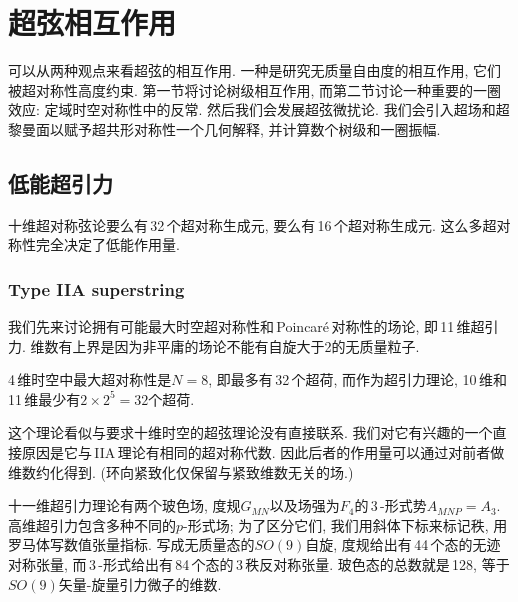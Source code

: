 
\chapter{超弦相互作用}

可以从两种观点来看超弦的相互作用. 一种是研究无质量自由度的相互作用, 它们被超对称性高度约束. 第一节将讨论树级相互作用, 而第二节讨论一种重要的一圈效应: 定域时空对称性中的反常. 然后我们会发展超弦微扰论. 我们会引入超场和超黎曼面以赋予超共形对称性一个几何解释, 并计算数个树级和一圈振幅.



\section{低能超引力}

十维超对称弦论要么有\,32\,个超对称生成元, 要么有\,16\,个超对称生成元. 这么多超对称性完全决定了低能作用量.

\subsection*{Type IIA superstring}

我们先来讨论拥有可能最大时空超对称性和\,Poincar\'{e}\,对称性的场论, 即\,11\,维超引力. 维数有上界是因为非平庸的场论不能有自旋大于2的无质量粒子.

\begin{tcolorbox}
    4\,维时空中最大超对称性是$ N=8$, 即最多有\,32\,个超荷, 而作为超引力理论, 10\,维和11\,维最少有$ 2\times 2^{5}=32 $个超荷.
\end{tcolorbox}

这个理论看似与要求十维时空的超弦理论没有直接联系. 我们对它有兴趣的一个直接原因是它与\,IIA\,理论有相同的超对称代数. 因此后者的作用量可以通过对前者做维数约化得到. (环向紧致化仅保留与紧致维数无关的场.)

十一维超引力理论有两个玻色场, 度规$ G_{MN}$以及场强为$ F_{\textit{4}} $的\,3\,-形式势$ A_{MNP}=A_{\textit{3}}$. 高维超引力包含多种不同的$ p $-形式场; 为了区分它们, 我们用斜体下标来标记秩, 用罗马体写数值张量指标. 写成无质量态的$ SO(9) $自旋, 度规给出有\,44\,个态的无迹对称张量, 而\,3\,-形式给出有\,84\,个态的\,3\,秩反对称张量. 玻色态的总数就是\,128, 等于$ SO(9) $矢量-旋量引力微子的维数.

